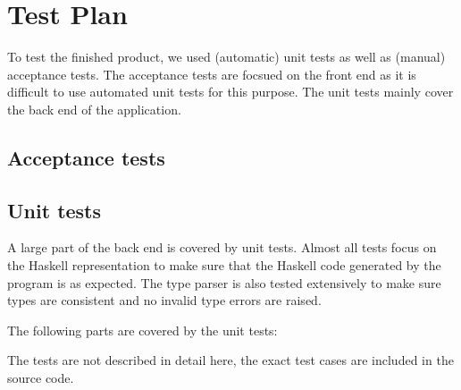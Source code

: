 \chapter{Test Plan}

To test the finished product, we used (automatic) unit tests as well as (manual) acceptance tests.
The acceptance tests are focsued on the front end as it is difficult to use automated unit tests for this purpose.
The unit tests mainly cover the back end of the application.

\section{Acceptance tests}



\section{Unit tests}

A large part of the back end is covered by unit tests.
Almost all tests focus on the Haskell representation to make sure that the Haskell code generated by the program is as expected.
The type parser is also tested extensively to make sure types are consistent and no invalid type errors are raised.

The following parts are covered by the unit tests:


The tests are not described in detail here, the exact test cases are included in the source code.
